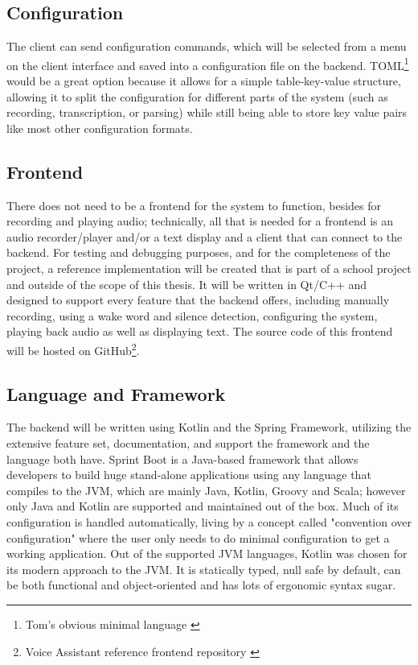 \subsection{Configuration}
The client can send configuration commands, which will be selected from a menu on the client interface and saved into a configuration file
on the backend. TOML\footnote{Tom's obvious minimal language \cite{toml}} would be a great option because it allows for a simple table-key-value structure, allowing it to split
the configuration for different parts of the system (such as recording, transcription, or parsing) while still being able
to store key value pairs like most other configuration formats.

\subsection{Frontend}
There does not need to be a frontend for the system to function, besides for recording and playing audio; technically, all that is needed for a frontend
is an audio recorder/player and/or a text display and a client that can connect to the backend. For testing and debugging purposes, and for
the completeness of the project, a reference implementation will be created that is part of a school project and outside of the scope of this thesis.
It will be written in Qt/C++ and designed to support every feature that the backend offers, including manually recording, using a wake word and silence detection,
configuring the system, playing back audio as well as displaying text. The source code of this frontend will be hosted on GitHub\footnote{Voice Assistant reference frontend repository \cite{frontend}}.

\subsection{Language and Framework} \label{subsec:language-and-framework}
The backend will be written using Kotlin and the Spring Framework, utilizing the extensive feature set, documentation, and support the framework and the language both have.
Sprint Boot is a Java-based framework that allows developers to build huge stand-alone applications using any language that compiles to the JVM,
which are mainly Java, Kotlin, Groovy and Scala; however only Java and Kotlin are supported and maintained out of the box.
Much of its configuration is handled automatically, living by a concept called "convention over configuration"
where the user only needs to do minimal configuration to get a working application.
Out of the supported JVM languages, Kotlin was chosen for its modern approach to the JVM. It is statically typed, null safe by default,
can be both functional and object-oriented and has lots of ergonomic syntax sugar.

